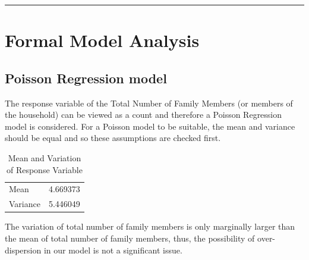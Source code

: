 \documentclass[
]{article}
\begin{document}
\begin{center}\rule{0.5\linewidth}{0.5pt}\end{center}

\newpage

\hypertarget{sec:FMA}{%
\section{Formal Model Analysis}\label{sec:FMA}}

\hypertarget{poisson-regression-model}{%
\subsection{Poisson Regression model}\label{poisson-regression-model}}

The response variable of the Total Number of Family Members (or members
of the household) can be viewed as a count and therefore a Poisson
Regression model is considered. For a Poisson model to be suitable, the
mean and variance should be equal and so these assumptions are checked
first.

\begin{table}

\caption{\label{tab:poisson mean and variance check}Mean and Variation of Response Variable}
\centering
\begin{tabular}[t]{l|r}
\hline
  & \\
\hline
Mean & 4.669373\\
\hline
Variance & 5.446049\\
\hline
\end{tabular}
\end{table}

The variation of total number of family members is only marginally
larger than the mean of total number of family members, thus, the
possibility of over-dispersion in our model is not a significant issue.
\end{document}
